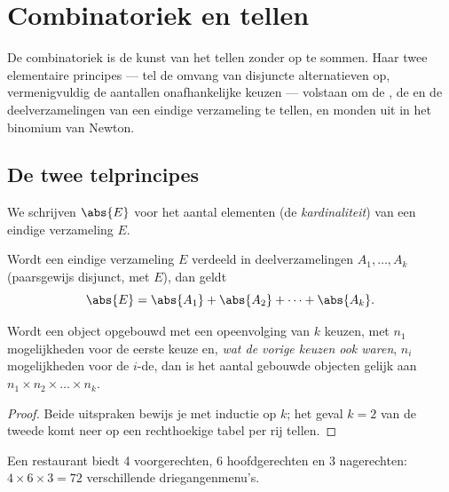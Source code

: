\chapter{Combinatoriek en tellen}\label{ch:g12:comb}

De combinatoriek is de kunst van het tellen zonder op te sommen. Haar twee
elementaire principes --- tel de omvang van disjuncte alternatieven op,
vermenigvuldig de aantallen onafhankelijke keuzen --- volstaan om de
, de  en de deelverzamelingen van een eindige verzameling
te tellen, en monden uit in het binomium van Newton.

\section{De twee telprincipes}

We schrijven $\abs{E}$ voor het aantal elementen (de
\emph{kardinaliteit}) van een eindige verzameling $E$.

\begin{proposition}[Somprincipe]\label{prop:g12:comb:addition}
Wordt een eindige verzameling $E$ verdeeld in deelverzamelingen
$A_1, \dots, A_k$ (paarsgewijs disjunct, met  $E$), dan geldt
\[
\abs{E} = \abs{A_1} + \abs{A_2} + \dots + \abs{A_k}.
\]
\end{proposition}

\begin{proposition}[Productprincipe]\label{prop:g12:comb:multiplication}
Wordt een object opgebouwd met een opeenvolging van $k$ keuzen, met $n_1$
mogelijkheden voor de eerste keuze en, \emph{wat de vorige keuzen ook waren},
$n_i$ mogelijkheden voor de $i$-de, dan is het aantal gebouwde objecten
gelijk aan $n_1 \times n_2 \times \dots \times n_k$.
\end{proposition}

\begin{proof}
Beide uitspraken bewijs je met inductie op $k$; het geval $k = 2$ van de
tweede komt neer op een rechthoekige tabel  per rij tellen.
\end{proof}

\begin{example}
Een restaurant biedt 4 voorgerechten, 6 hoofdgerechten en 3 nagerechten:
$4 \times 6 \times 3 = 72$ verschillende driegangenmenu's.
\end{example}

